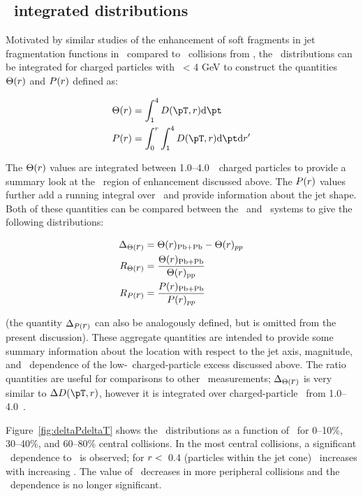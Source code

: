 \subsection{\pt\ integrated distributions}
\label{sec:discussion_int}
Motivated by similar studies of the enhancement of soft fragments in 
jet fragmentation functions in \pbpb\ compared to \pp\ collisions from \cite{Aaboud:2018hpb}, the \Dptr\ distributions can be integrated for charged particles with \pt\ < 4 GeV to construct the quantities $\Theta(\mbox{$r$})$ and $P(\mbox{$r$})$ defined as:

\begin{align}
   \Theta(\rvar) &= \int_1^{4} \Dptr  \fd \pt \\
   P(\rvar) &= \int_0^r \int_1^{4} \Dptr \fd \pt \fd r'
\end{align}

The $\Theta(\mbox{$r$})$ values are integrated between 1.0--4.0~\GeV\ charged particles to provide a summary look at
the \pt\ region of enhancement discussed above.  The $P(\mbox{$r$})$ values further add a running integral over \rvar\
and provide information about the jet shape.
Both of these quantities can be compared between the \pp\ and \pbpb\ systems to give the following distributions:

\begin{align}
   \Delta_{\Theta(\mbox{$r$})} &= \Theta(\mbox{$r$})_{\mathrm{Pb+Pb}} - \Theta(\mbox{$r$})_{pp} \\
   R_{\Theta(\mbox{$r$})} &= \frac{\Theta(\mbox{$r$})_{\mathrm{Pb+Pb}}}{\Theta(\mbox{$r$})_{\mathrm{pp}}} \\
   R_{P(\mbox{$r$})} &= \frac{P(\mbox{$r$})_{\mathrm{Pb+Pb}}}{P(\mbox{$r$})_{pp}}
\end{align}

(the quantity $\Delta_{P(\mbox{$r$})}$ can also be analogously defined, but is omitted from the present discussion).
These aggregate quantities are intended to provide some summary information about the location with respect to the 
jet axis, magnitude, and \ptjet\ dependence of the low-\pt\ charged-particle excess discussed above.
The ratio quantities are useful for comparisons to other \pbpb\ measurements; $\Delta_{\Theta(\mbox{$r$})}$ is very similar 
to $\DeltaDptr$, however it is integrated over charged-particle \pt\ from 1.0--4.0~\GeV.

Figure~\ref{fig:deltaPdeltaT} shows the \DeltaTheta\ distributions as a function of \rvar\ for 0--10\%, 30--40\%,
and 60--80\% central collisions. 
In the most central collisions, a significant \ptjet\ dependence to \DeltaTheta\ is observed; for $\mbox{$r$} <$~0.4 (particles
within the jet cone) \DeltaTheta\ increases with increasing \ptjet.
The value of \DeltaTheta\ decreases in more peripheral collisions and the \ptjet\ dependence is no longer significant.

